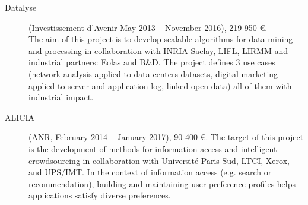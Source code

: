 \begin{description}
\item[Datalyse] (Investissement d'Avenir May 2013 -- November 2016), 219 950 \euro. \\
The aim of this project is to develop scalable algorithms for data mining and processing in collaboration with INRIA Saclay, LIFL, LIRMM and industrial partners: Eolas and B\&D. The project defines 3 use cases (network analysis applied to data centers datasets, digital marketing applied to server and application log, linked open data) all of them with industrial impact. 

\item[ALICIA] (ANR, February 2014 -- January 2017), 90 400 \euro. The target of this project is the development of methods for information access and intelligent crowdsourcing in collaboration with Universit{\'e} Paris Sud, LTCI, Xerox, and UPS/IMT. In the context of information access (e.g. search or recommendation), building and maintaining user preference profiles helps applications satisfy diverse preferences. 


\end{description}
